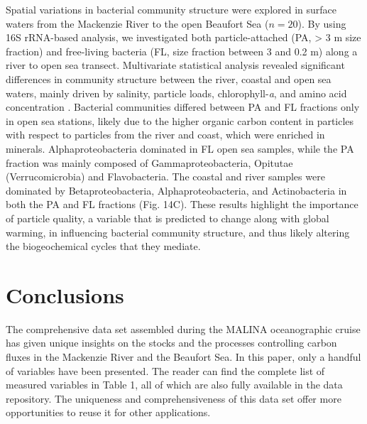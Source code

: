 \documentclass[essd, manuscript]{copernicus}
\begin{document}
Spatial variations in bacterial community structure were explored in surface waters from the Mackenzie River to the open Beaufort Sea ($n = 20$). By using 16S rRNA-based analysis, we investigated both particle-attached (PA, > 3 \textmu m size fraction) and free-living bacteria (FL, size fraction between 3 and 0.2 \textmu m) along a river to open sea transect. Multivariate statistical analysis revealed significant differences in community structure between the river, coastal and open sea waters, mainly driven by salinity, particle loads, chlorophyll-\textit{a}, and amino acid concentration \citep{Ortega-Retuerta2013}. Bacterial communities differed between PA and FL fractions only in open sea stations, likely due to the higher organic carbon content in particles with respect to particles from the river and coast, which were enriched in minerals. Alphaproteobacteria dominated in FL open sea samples, while the PA fraction was mainly composed of Gammaproteobacteria, Opitutae (Verrucomicrobia) and Flavobacteria. The coastal and river samples were dominated by Betaproteobacteria, Alphaproteobacteria, and Actinobacteria in both the PA and FL fractions (Fig. 14C). These results highlight the importance of particle quality, a variable that is predicted to change along with global warming, in influencing bacterial community structure, and thus likely altering the biogeochemical cycles that they mediate. 

\section{Conclusions}

The comprehensive data set assembled during the MALINA oceanographic cruise has given unique insights on the stocks and the processes controlling carbon fluxes in the Mackenzie River and the Beaufort Sea. In this paper, only a handful of variables have been presented. The reader can find the complete list of measured variables in Table 1, all of which are also fully available in the data repository. The uniqueness and comprehensiveness of this data set offer more opportunities to reuse it for other applications.

\end{document}
